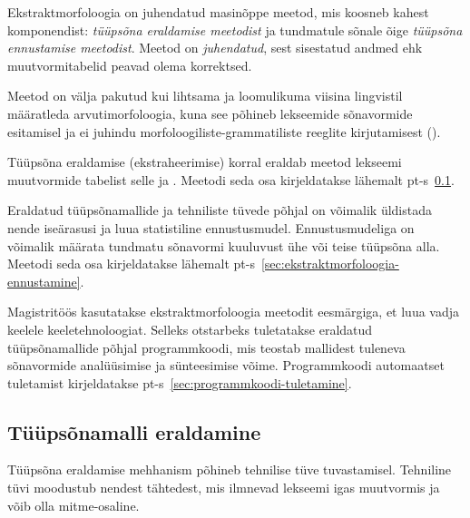 \documentclass[12pt,a4paper]{article}
\begin{document}

Ekstraktmorfoloogia on juhendatud masinõppe meetod, mis koosneb kahest komponendist: \emph{tüüpsõna eraldamise meetodist} ja tundmatule sõnale õige \emph{tüüpsõna ennustamise meetodist}. Meetod on \textit{juhendatud}, sest sisestatud andmed ehk muutvormi\-tabelid peavad olema korrektsed.


Meetod on välja pakutud kui lihtsama ja loomulikuma viisina lingvistil määratleda arvutimorfoloogia, kuna see põhineb lekseemide sõnavormide esitamisel ja ei juhindu morfoloogiliste-grammatiliste reeglite kirjutamisest (\cite[14]{forsberg_what_2016}).

Tüüpsõna eraldamise (ekstraheerimise) korral eraldab meetod lekseemi muutvormide tabelist selle  ja . Meetodi seda osa kirjeldatakse lähemalt pt-s~\ref{sec:ekstraktmorfoloogia-eraldamine}.

Eraldatud tüüpsõnamallide ja tehniliste tüvede põhjal on võimalik üldistada nende iseärasusi ja luua statistiline ennustus\-mudel. Ennustus\-mudeliga on võimalik määrata tundmatu sõnavormi kuuluvust ühe või teise tüüpsõna alla. Meetodi seda osa kirjeldatakse lähemalt pt-s~\ref{sec:ekstraktmorfoloogia-ennustamine}.

Magistritöös kasutatakse ekstraktmorfoloogia meetodit eesmärgiga, et luua vadja keelele keele\-tehnoloogiat. Selleks otstarbeks tuletatakse eraldatud tüüpsõna\-mallide põhjal programm\-koodi, mis teostab mallidest tuleneva sõnavormide analüüsimise ja sünteesimise võime. Programm\-koodi automaatset tuletamist kirjeldatakse pt-s~\ref{sec:programmkoodi-tuletamine}.






\subsection{Tüüpsõnamalli eraldamine}
\label{sec:ekstraktmorfoloogia-eraldamine}
Tüüpsõna eraldamise mehhanism põhineb tehnilise tüve tuvastamisel. Tehniline tüvi moodustub nendest tähtedest, mis ilmnevad lekseemi igas muutvormis ja võib olla mitme-osaline.
\end{document}

